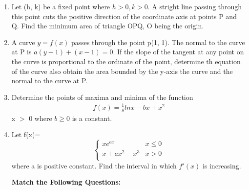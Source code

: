 \begin{enumerate}[label=\arabic*.,ref=\thesubsection.\theenumi]
\item Let (h, k) be a fixed point where $h > 0, k > 0$. A stright line passing through this point cuts the positive direction of the coordinate axis at points P and Q. Find the minimum area of triangle OPQ, O being the origin.

\item A curve $y = f(x)$ passes through the point p(1, 1). The normal to the curve at P is $a(y - 1) + (x - 1) = 0$. If the slope of the tangent at any point on the curve is proportional to the ordinate of the point, determine th equation of the curve also obtain the area bounded by the y-axis the curve and the normal to the curve at P.

\item Determine the points of maxima and minima of the function 
\begin{align*} 
f(x) = \frac{1}{8} ln x - bx + x^2
\end{align*}
x $>$ 0 where $b \geq 0$ is a constant.

\item Let 
f(x)=
\[ \begin{cases} 
      xe^{ax} &  x \leq 0 \\
      x + ax^2 - x^3& x > 0\\
      \end{cases}
\] 
where a is positive constant. Find  the interval in which $f'(x)$ is increasing.



\clearpage
\onecolumn

\textbf{Match the Following Questions:}


\end{enumerate}
